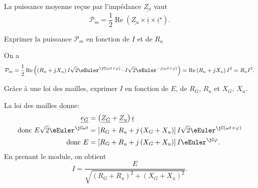 \debutEntrainement


La puissance moyenne reçue par l'impédance $\underline{Z_{u}}$ vaut
\[
\mathcal{P}_{m}=\dfrac{1}{2}\operatorname{Re}\left(\underline{Z_{u}}\times \underline{i}\times\underline{i}^{\star}\right).
\] 





\begin{enonce}
Exprimer la puissance $\mathcal{P}_{m}$ en fonction de $I$ et de $R_u$
\end{enonce}


\begin{corrige}
On a 
\[
\mathcal{P}_{m}  =\dfrac{1}{2}\operatorname{Re}\left(\left(R_{u}+jX_{u}\right)I\sqrt{2}\eEuler^{\jC \left(\omega t+\varphi\right)}\cdot I\sqrt{2}\eEuler^{-j\left(\omega t+\varphi\right)}\right)=\operatorname{Re}\left(R_{u}+jX_{u}\right)I^{2}
  =R_{u}I^{2}.
  \]
\end{corrige}




\begin{enonce}
Grâce à une loi des mailles, exprimer $I$ en fonction de $E$, de $R_{G}$, $R_{u}$ et $X_{G}$, $X_{u}$.

\end{enonce}


\begin{corrige}
La loi des mailles donne:
\begin{align*}
\underline{e_{G}} & =\left(\underline{Z_{G}}+\underline{Z_{u}}\right)\underline{i}\\
\text{donc } E\sqrt{2}\eEuler^{\jC \omega t} & =\left[R_{G}+R_{u}+j\left(X_{G}+X_{u}\right)\right]I\sqrt{2}\eEuler^{\jC \left(\omega t+\varphi\right)}\\
\text{donc } E & =\left[R_{G}+R_{u}+j\left(X_{G}+X_{u}\right)\right]I\eEuler^{\jC \varphi}.
\end{align*}
En prenant le module, on obtient
\[
I=\dfrac{E}{\sqrt{\left(R_{G}+R_{u}\right)^{2}+\left(X_{G}+X_{u}\right)^{2}}}.
\]
\end{corrige}

